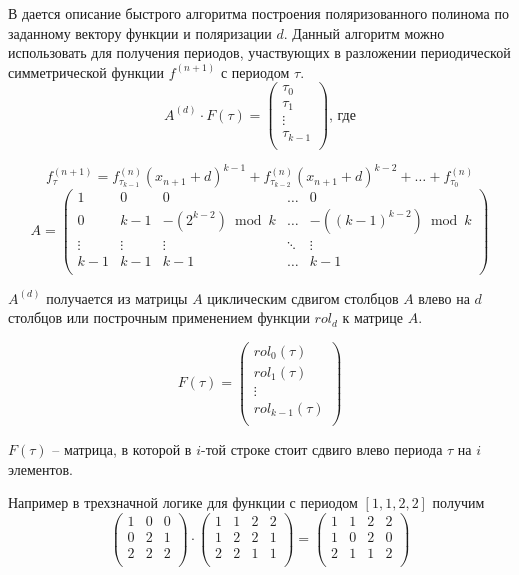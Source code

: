 \documentclass[bibliography=totoc, a4paper, 14pt]{extarticle}
\begin{document}
В \cite{sm09} дается описание быстрого алгоритма построения поляризованного полинома по заданному вектору
функции и поляризации $d$. Данный алгоритм можно использовать для получения периодов, участвующих в разложении
периодической симметрической функции $f^{(n+1)}$ с периодом $\tau$.
$$A^{(d)} \cdot F(\tau) = \begin{pmatrix}
\tau_0 \\
\tau_1 \\
\vdots \\
\tau_{k-1} \\
\end{pmatrix} \text{, где}
$$

\begin{equation}
\label{deg}
f_{\tau}^{(n+1)} = f_{\tau_{k-1}}^{(n)}(x_{n+1}+d)^{k-1} + f_{\tau_{k-2}}^{(n)}(x_{n+1}+d)^{k-2} + \ldots + f_{\tau_{0}}^{(n)}
\end{equation}
$$
A = \begin{pmatrix}
1      & 0      & 0                  & \ldots & 0                      \\
0      & k-1    & -(2^{k-2}) \bmod k & \ldots & -((k-1)^{k-2}) \bmod k \\
\vdots & \vdots &  \vdots            & \ddots & \vdots                 \\
k-1    & k-1    & k-1                & \ldots & k-1                    \\
\end{pmatrix}
$$

$A^{(d)}$ получается из матрицы $A$ циклическим сдвигом столбцов $A$ влево на $d$ столбцов или построчным применением
функции $rol_d$ к матрице $A$.

$$
F(\tau) = \begin{pmatrix}
rol_0(\tau)     \\
rol_1(\tau)     \\
\vdots          \\
rol_{k-1}(\tau) \\
\end{pmatrix}
$$

$F(\tau)$ -- матрица, в которой в $i$-той строке стоит сдвиго влево периода $\tau$ на $i$ элементов.

Например в трехзначной логике для функции с периодом $[1,1,2,2]$ получим
$$
\begin{pmatrix}
1 & 0 & 0 \\
0 & 2 & 1 \\
2 & 2 & 2 \\
\end{pmatrix}
\cdot
\begin{pmatrix}
1 & 1 & 2 & 2 \\
1 & 2 & 2 & 1 \\
2 & 2 & 1 & 1 \\
\end{pmatrix}
=
\begin{pmatrix}
1 & 1 & 2 & 2 \\
1 & 0 & 2 & 0 \\
2 & 1 & 1 & 2 \\
\end{pmatrix}
$$
\end{document}
